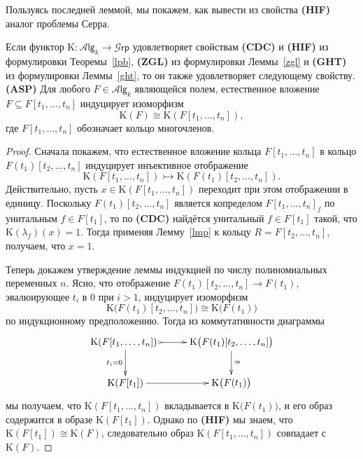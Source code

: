 \documentclass[12pt,a4paper]{article}
\begin{document}
Пользуясь последней леммой, мы покажем, как вывести из свойства {\bf(HIF)} аналог проблемы Серра.
\begin{lemma}
\label{asp}
Если функтор $\mathrm K\colon\mathcal A\mathsf{lg}_k\rightarrow\mathcal G\mathsf{rp}$ удовлетворяет свойствам {\bf(CDC)} и {\bf(HIF)} из формулировки Теоремы~\ref{lpb}, {\bf(ZGL)} из формулировки Леммы~\ref{zgl} и {\bf(GHT)} из формулировки Леммы~\ref{ght}, то он также удовлетворяет следующему свойству.\\
{\bf(ASP)} Для любого $F\in\mathcal A\mathsf{lg}_k$ являющейся полем, естественное вложение $F\subseteq F[t_1,\ldots,t_n]$ индуцирует изоморфизм
$$
\mathrm K(F)\cong\mathrm K(F[t_1,\ldots,t_n]),
$$
где $F[t_1,\ldots,t_n]$ обозначает кольцо многочленов.
\end{lemma}
\begin{proof}
Сначала покажем, что естественное вложение кольца $F[t_1,\ldots,t_n]$ в кольцо $F(t_1)[t_2,\ldots,t_n]$ индуцирует инъективное отображение
$$
\mathrm K(F[t_1,\ldots,t_n])\rightarrowtail\mathrm K(F(t_1)[t_2,\ldots,t_n]).
$$
Действительно, пусть $x\in\mathrm K(F[t_1,\ldots,t_n])$ переходит при этом отображении в единицу. Поскольку $F(t_1)[t_2,\ldots,t_n]$ является копределом $F[t_1,\ldots,t_n]_f$ по унитальным $f\in F[t_1]$, то по {\bf(CDC)} найдётся унитальный $f\in F[t_1]$ такой, что $\mathrm K(\lambda_f)(x)=1$. Тогда применяя Лемму~\ref{lmp} к кольцу $R=F[t_2,\ldots,t_n]$, получаем, что $x=1$. 

Теперь докажем утверждение леммы индукцией по числу полиномиальных переменных $n$. Ясно, что отображение $F(t_1)[t_2,\ldots,t_n]\rightarrow F(t_1)$, эвалюирующее $t_i$ в $0$ при $i>1$, индуцирует изоморфизм
$$
\mathrm K\big(F(t_1)[t_2,\ldots,t_n]\big)\cong\mathrm K\big(F(t_1)\big)
$$
по индукционному предположению. Тогда из коммутативности диаграммы
$$
\xymatrix{
\mathrm K(F[t_1,\ldots,t_n])\ \ar@{>->}[r]\ar[d]_{t_i=0}&\mathrm K\big(F(t_1)[t_2,\ldots,t_n]\big)\ar[d]^{\cong}\\
\mathrm K(F[t_1])\ar[r]&\mathrm K\big(F(t_1)\big)
}
$$
мы получаем, что $\mathrm K(F[t_1,\ldots,t_n])$ вкладывается в $\mathrm K\big(F(t_1)\big)$, и его образ содержится в образе $\mathrm K(F[t_1])$. Однако по {\bf(HIF)} мы знаем, что $\mathrm K(F[t_1])\cong\mathrm K(F)$, следовательно образ $\mathrm K(F[t_1,\ldots,t_n])$ совпадает с $\mathrm K(F)$.
\end{proof}
\end{document}
